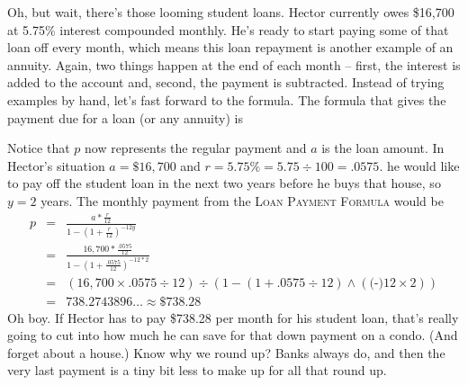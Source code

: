 Oh, but wait, there's those looming student loans.  Hector currently owes \$16,700 at 5.75\% interest compounded monthly.  He's ready to start paying some of that loan off every month, which means this loan repayment is another example of an annuity.  Again, two things happen at the end of each month -- first, the interest is added to the account and, second, the payment is subtracted.  Instead of trying examples by hand, let's fast forward to the formula.  The formula that gives the payment due for a loan (or any annuity) is

 \bigskip
\bigskip

Notice that $p$ now represents the regular payment and $a$ is the loan amount.
In Hector's situation $a = \$16,700$ and $r=5.75\%=5.75 \div 100=.0575$. he would like to pay off the student loan in the next two years before he buys that house, so $y=2$ years.  The monthly payment from the  \textsc{Loan Payment Formula} would be
\begin{eqnarray*}
p & = &   \frac{a  \ast \frac{r}{12}}{1-\left( 1 + \frac{r}{12}\right) ^{-12y}} \\
& = &    \frac{16,700 \ast \frac{.0575}{12}}{1-\left( 1 + \frac{.0575}{12}\right) ^{-12\ast 2}}\\
& =  & \left(16,700 \times .0575 \div 12 \right) \div \left(1-(1+.0575 \div 12) \wedge (\text{(-)}12 \times 2)\right) \\
& =  & 738.2743896\ldots  \approx \$738.28
\end{eqnarray*}
Oh boy.  If Hector has to pay \$738.28 per month for his student loan, that's really going to cut into how much he can save for that down payment on a condo.  (And forget about a house.) Know why we round up?  Banks always do, and then the very last payment is a tiny bit less to make up for all that round up.

